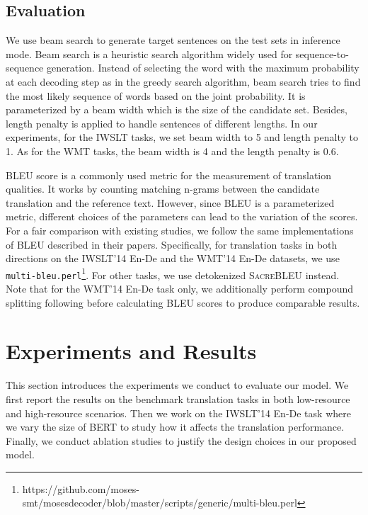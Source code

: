\documentclass[review]{elsarticle}
\begin{document}
\subsection{Evaluation}

We use beam search to generate target sentences on the test sets in inference mode.
Beam search is a heuristic search algorithm widely used for sequence-to-sequence generation. Instead of selecting the word with the maximum probability at each decoding step as in the greedy search algorithm, beam search tries to find the most likely sequence of words based on the joint probability. It is parameterized by a beam width which is the size of the candidate set. Besides, length penalty is applied to handle sentences of different lengths.
In our experiments, for the IWSLT tasks, we set beam width to 5 and length penalty to 1. As for the WMT tasks, the beam width is 4 and the length penalty is 0.6.

BLEU score \cite{Papineni02} is a commonly used metric for the measurement of translation qualities. 
It works by counting matching n-grams between the candidate translation and the reference text. 
However, since BLEU is a parameterized metric, different choices of the parameters can lead to the variation of the scores. For a fair comparison with existing studies, we follow the same implementations of BLEU described in their papers. Specifically, for translation tasks in both directions on the IWSLT'14 En-De and the WMT'14 En-De datasets, we use \texttt{multi-bleu.perl}\footnote{https://github.com/moses-smt/mosesdecoder/blob/master/scripts/generic/multi-bleu.perl}. For other tasks, we use detokenized \textsc{SacreBLEU} \cite{Post18} instead.
Note that for the WMT'14 En-De task only, we additionally perform compound splitting following \citet{Vaswani17} before calculating BLEU scores to produce comparable results.



\section{Experiments and Results}
\label{sec:results}
This section introduces the experiments we conduct to evaluate our model. We first report the results on the benchmark translation tasks in both low-resource and high-resource scenarios. Then we work on the IWSLT'14 En-De task where we vary the size of BERT to study how it affects the translation performance. Finally, we conduct ablation studies to justify the design choices in our proposed model.
\end{document}
